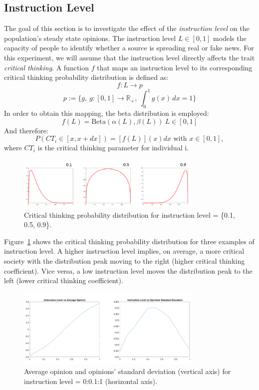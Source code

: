\subsection{Instruction Level}
\label{sec:Instr_Level}
The goal of this section is to investigate the effect of the \emph{instruction level} on the population's steady state opinions. The instruction level $L \in [0,1]$ models the capacity of people to identify whether a source is spreading real or fake news. For this experiment, we will assume that the instruction level directly affects the trait \emph{critical thinking}. A function $f$  that maps an instruction level to its corresponding critical thinking probability distribution is defined as:
$$
f: L \to p 
$$
$$
p:= \{g,\ g: [0,1] \to \mathbb{R}_+,\ \int_{0}^{1} g(x) \,dx = 1\}
$$
In order to obtain this mapping, the beta distribution is employed: 
$$
f(L) = \text{Beta}(\alpha(L), \beta(L))\ L \in [0,1]
$$
And therefore:
$$
P(CT_i\in[x,x+dx]) = [f(L)](x) dx \text{ with } x\in [0,1],
$$
where $CT_i$ is the critical thinking parameter for individual i. 
\begin{figure}[!t]
	\centering
	\includegraphics[width=3.5in]{Figures/instruction_level_dist.png}
	\caption{Critical thinking probability distribution for instruction level = \{0.1, 0.5, 0.9\}.}
	\label{pics:critdistribution}
\end{figure}
Figure~\ref{pics:critdistribution} shows the critical thinking probability distribution for three examples of instruction level. A higher instruction level implies, on average, a more critical society with the distribution peak moving to the right (higher critical thinking coefficient). Vice versa, a low instruction level moves the distribution peak to the left (lower critical thinking coefficient). \newline
\begin{figure}[!t]
	\centering
	\includegraphics[width=3.5in]{Figures/instruction_results.png}
	\caption{Average opinion and opinions' standard deviation (vertical axis) for instruction level = 0:0.1:1 (horizontal axis).}
	\label{pics:critstatistics}
\end{figure}
